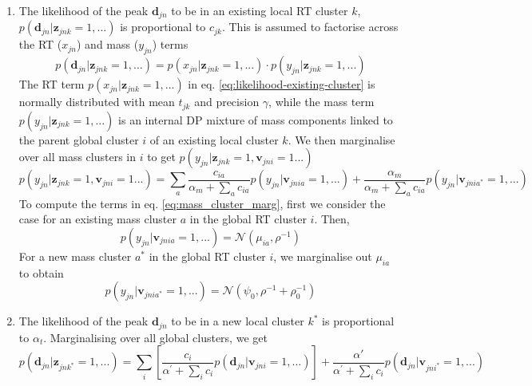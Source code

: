 \begin{enumerate}
\item The likelihood of the peak $\mathbf{d}_{jn}$ to be in an existing local RT cluster $k$, $p(\mathbf{d}_{jn}|\boldsymbol{z}_{jnk}=1,...)$ is proportional to $c_{jk}$. This is assumed to factorise across the RT ($x_{jn}$) and mass ($y_{jn}$) terms
\begin{dmath}
p(\mathbf{d}_{jn}|\boldsymbol{z}_{jnk}=1,...)=p(x_{jn}|\boldsymbol{z}_{jnk}=1,...)\cdot p(y_{jn}|\boldsymbol{z}_{jnk}=1,...)
\label{eq:likelihood-existing-cluster}
\end{dmath}
The RT term $p(x_{jn}|\boldsymbol{z}_{jnk}=1,...)$ in eq. \ref{eq:likelihood-existing-cluster} is normally distributed with mean $t_{jk}$ and precision $\gamma$, while the mass term $p(y_{jn}|\boldsymbol{z}_{jnk}=1,...)$ is an internal DP mixture of mass components linked to the parent global cluster $i$ of an existing local cluster $k$. We then marginalise over all mass clusters in $i$ to get $p(y_{jn}|\boldsymbol{z}_{jnk}=1,\boldsymbol{v}_{jni}=1...)$
\begin{dmath}
p(y_{jn}|\boldsymbol{z}_{jnk}=1,\boldsymbol{v}_{jni}=1...)=\sum_{a}\frac{c_{ia}}{\alpha_{m}+\sum_{a}c_{ia}}p(y_{jn}|\boldsymbol{v}_{jnia}=1,...)+\frac{\alpha_{m}}{\alpha_{m}+\sum_{a}c_{ia}}p(y_{jn}|\boldsymbol{v}_{jnia^{*}}=1,...)
\label{eq:mass_cluster_marg}
\end{dmath}
To compute the terms in eq. \ref{eq:mass_cluster_marg}, first we consider the case for an existing mass cluster $a$ in the global RT cluster $i$. Then,
\begin{dmath}
p(y_{jn}|\boldsymbol{v}_{jnia}=1,...)=\mathcal{N}(\mu_{ia},\rho^{-1})
\end{dmath}
For a new mass cluster $a^{*}$ in the global RT cluster $i$, we marginalise out $\mu_{ia}$ to obtain
\begin{dmath}
p(y_{jn}|\boldsymbol{v}_{jnia^{*}}=1,...)=\mathcal{N}(\psi_{0},\rho^{-1}+\rho_{0}^{-1})
\end{dmath}
\item The likelihood of the peak $\mathbf{d}_{jn}$ to be in a new local cluster $k^{*}$ is proportional to $\alpha_{t}$. Marginalising over all global clusters,
we get
\begin{dmath}
p(\mathbf{d}_{jn}|\boldsymbol{z}_{jnk^{*}}=1,...)=\sum_{i}\left[\frac{c_{i}}{\alpha^{'}+\sum_{i}c_{i}}p(\mathbf{d}_{jn}|\boldsymbol{v}_{jni}=1,...)\right]+\frac{\alpha'}{\alpha^{'}+\sum_{i}c_{i}}p(\mathbf{d}_{jn}|\boldsymbol{v}_{jni^{*}}=1,...)
\label{eq:global_cluster_marg}

\end{dmath}
\end{enumerate}
